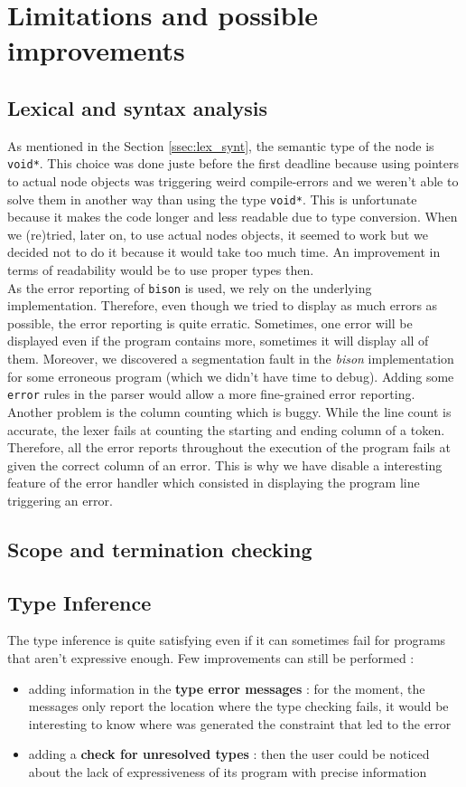 \documentclass[a4paper,11pt]{article}
\begin{document}
\section{Limitations and possible improvements}
\subsection{Lexical and syntax analysis}
\label{ssec:flaws_syntax}
As mentioned in the Section \ref{ssec:lex_synt}, the semantic type of the node is \texttt{void*}. This choice was done juste before the first deadline because using pointers to actual node objects was triggering weird compile-errors and we weren't able to solve them in another way than using the type \texttt{void*}. This is unfortunate because it makes the code longer and less readable due to type conversion. When we (re)tried, later on, to use actual nodes objects, it seemed to work but we decided not to do it because it would take too much time. An improvement in terms of readability would be to use proper types then.
\\
As the error reporting of \texttt{bison} is used, we rely on the underlying implementation. Therefore, even though we tried to display as much errors as possible, the error reporting is quite erratic. Sometimes, one error will be displayed even if the program contains more, sometimes it will display all of them. Moreover, we discovered a segmentation fault in the \textit{bison} implementation for some erroneous program (which we didn't have time to debug). Adding some \texttt{error} rules in the parser would allow a more fine-grained error reporting. \\
Another problem is the column counting which is buggy. While the line count is accurate, the lexer fails at counting the starting and ending column of a token. Therefore, all the error reports throughout the execution of the program fails at given the correct column of an error. This is why we have disable a interesting feature of the error handler which consisted in displaying the program line triggering an error.
\subsection{Scope and termination checking}
\subsection{Type Inference}
The type inference is quite satisfying even if it can sometimes fail for programs that aren't expressive enough. Few improvements can still be performed :
\begin{itemize}
	\item adding information in the \textbf{type error messages} : for the moment, the messages only report the location where the type checking fails, it would be interesting to know where was generated the constraint that led to the error
	\item adding a \textbf{check for unresolved types} : then the user could be noticed about the lack of expressiveness of its program with precise information
\end{itemize}
\end{document}
